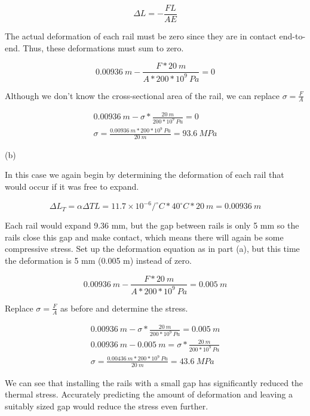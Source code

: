 \documentclass[
  letterpaper,
  DIV=11,
  numbers=noendperiod]{scrreprt}
\theoremstyle{definition}
\theoremstyle{remark}
\begin{document}
\begin{tcolorbox}
\begin{tcolorbox}
\[
\Delta L=-\frac{F L}{A E}
\]

The actual deformation of each rail must be zero since they are in
contact end-to-end. Thus, these deformations must sum to zero.

\[
0.00936{~m}-\frac{F * 20{~m}}{A * 200 * 10^9{~Pa}}=0
\]

Although we don't know the cross-sectional area of the rail, we can
replace \(\sigma=\frac{F}{A}\)

\[
\begin{gathered}
0.00936{~m}-\sigma * \frac{20{~m}}{200 * 10^9{~Pa}}=0 \\
\sigma=\frac{0.00936{~m} * 200 * 10^9{~Pa}}{20{~m}}=93.6{~MPa}
\end{gathered}
\]

(b)

In this case we again begin by determining the deformation of each rail
that would occur if it was free to expand.

\[
\Delta L_T=\alpha \Delta T L=11.7 \times 10^{-6}/^\circ{C} * 40^\circ{C} * 20{~m}=0.00936{~m}
\]

Each rail would expand 9.36 mm, but the gap between rails is only 5 mm
so the rails close this gap and make contact, which means there will
again be some compressive stress. Set up the deformation equation as in
part (a), but this time the deformation is 5 mm (0.005 m) instead of
zero.

\[
0.00936{~m}-\frac{F * 20{~m}}{A * 200 * 10^9{~Pa}}=0.005{~m}
\]

Replace \(\sigma=\frac{F}{A}\) as before and determine the stress.

\[
\begin{gathered}
0.00936{~m}-\sigma * \frac{20{~m}}{200 * 10^9{~Pa}}=0.005{~m} \\
0.00936{~m}-0.005{~m}=\sigma * \frac{20{~m}}{200 * 10^9{~Pa}} \\
\sigma=\frac{0.00436{~m} * 200 * 10^9{~Pa}}{20{~m}}=43.6{~MPa}
\end{gathered}
\]

We can see that installing the rails with a small gap has significantly
reduced the thermal stress. Accurately predicting the amount of
deformation and leaving a suitably sized gap would reduce the stress
even further.

\end{tcolorbox}

\end{tcolorbox}
\end{document}

